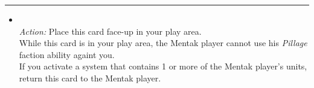 \begin{multicols}{2}
\vspace{-10pt}\rule{\hsize}{0.4pt}\vspace{5pt}


\begin{itemize}
\item {}\\
\emph{Action:} Place this card face-up in your play area.\\
While this card is in your play area, the Mentak player cannot use his \emph{Pillage} faction ability againt you.\\
If you activate a system that contains 1 or more of the Mentak player's units, return this card to the Mentak player.
\end{itemize}

\end{multicols}



